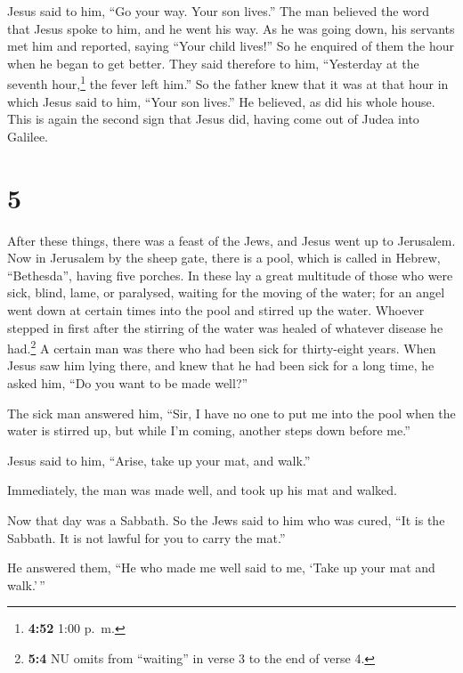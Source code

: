  Jesus said to him, ``Go your way. Your son lives.'' The
man believed the word that Jesus spoke to him, and he went his way.
 As he was going down, his servants met him and reported,
saying ``Your child lives!''  So he enquired of them the
hour when he began to get better. They said therefore to him,
``Yesterday at the seventh hour,\footnote{\textbf{4:52} 1:00 p.~m.} the
fever left him.''  So the father knew that it was at that
hour in which Jesus said to him, ``Your son lives.'' He believed, as did
his whole house.  This is again the second sign that
Jesus did, having come out of Judea into Galilee.

\hypertarget{section-4}{%
\section{5}\label{section-4}}

 After these things, there was a feast of the Jews, and
Jesus went up to Jerusalem.  Now in Jerusalem by the sheep
gate, there is a pool, which is called in Hebrew, ``Bethesda'', having
five porches.  In these lay a great multitude of those who
were sick, blind, lame, or paralysed, waiting for the moving of the
water;  for an angel went down at certain times into the
pool and stirred up the water. Whoever stepped in first after the
stirring of the water was healed of whatever disease he had.\footnote{\textbf{5:4}
  NU omits from ``waiting'' in verse 3 to the end of verse 4.}
 A certain man was there who had been sick for
thirty-eight years.  When Jesus saw him lying there, and
knew that he had been sick for a long time, he asked him, ``Do you want
to be made well?''

 The sick man answered him, ``Sir, I have no one to put me
into the pool when the water is stirred up, but while I'm coming,
another steps down before me.''

 Jesus said to him, ``Arise, take up your mat, and walk.''

 Immediately, the man was made well, and took up his mat
and walked.

Now that day was a Sabbath.  So the Jews said to him who
was cured, ``It is the Sabbath. It is not lawful for you to carry the
mat.''

 He answered them, ``He who made me well said to me,
`Take up your mat and walk.'\,''

